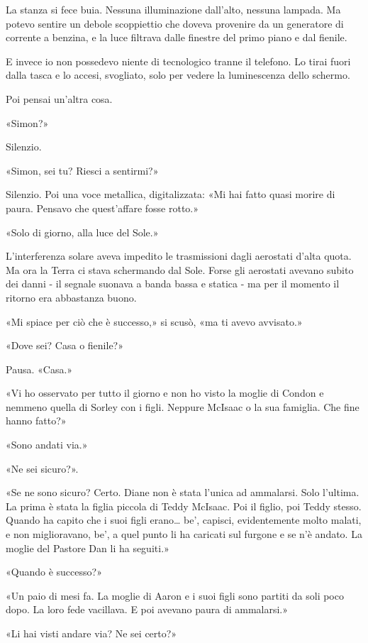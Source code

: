 La stanza si fece buia. Nessuna illuminazione dall'alto, nessuna
lampada. Ma potevo sentire un debole scoppiettio che doveva provenire da
un generatore di corrente a benzina, e la luce filtrava dalle finestre
del primo piano e dal fienile.

E invece io non possedevo niente di tecnologico tranne il telefono. Lo
tirai fuori dalla tasca e lo accesi, svogliato, solo per vedere la
luminescenza dello schermo.

Poi pensai un'altra cosa.

\separatorefiori

«Simon?»

Silenzio.

«Simon, sei tu? Riesci a sentirmi?»

Silenzio. Poi una voce metallica, digitalizzata: «Mi hai fatto quasi
morire di paura. Pensavo che quest'affare fosse rotto.»

«Solo di giorno, alla luce del Sole.»

L'interferenza solare aveva impedito le trasmissioni dagli aerostati
d'alta quota. Ma ora la Terra ci stava schermando dal Sole. Forse gli
aerostati avevano subito dei danni - il segnale suonava a banda bassa e
statica - ma per il momento il ritorno era abbastanza buono.

«Mi spiace per ciò che è successo,» si scusò, «ma ti avevo avvisato.»

«Dove sei? Casa o fienile?»

Pausa. «Casa.»

«Vi ho osservato per tutto il giorno e non ho visto la moglie di Condon
e nemmeno quella di Sorley con i figli. Neppure McIsaac o la sua
famiglia. Che fine hanno fatto?»

«Sono andati via.»

«Ne sei sicuro?».

«Se ne sono sicuro? Certo. Diane non è stata l'unica ad ammalarsi. Solo
l'ultima. La prima è stata la figlia piccola di Teddy McIsaac. Poi il
figlio, poi Teddy stesso. Quando ha capito che i suoi figli
erano\ldots{} be', capisci, evidentemente molto malati, e non
miglioravano, be', a quel punto li ha caricati sul furgone e se n'è
andato. La moglie del Pastore Dan li ha seguiti.»

«Quando è successo?»

«Un paio di mesi fa. La moglie di Aaron e i suoi figli sono partiti da
soli poco dopo. La loro fede vacillava. E poi avevano paura di
ammalarsi.»

«Li hai visti andare via? Ne sei certo?»

